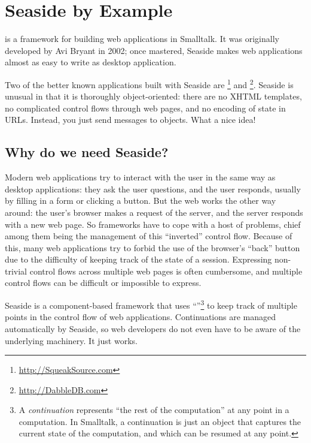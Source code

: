 \documentclass[a4paper,10pt,twoside]{book}
\begin{document}
	\sloppy
\fi
\chapter{Seaside by Example}
\label{cha:seaside}




 is a framework for building web applications in Smalltalk.  It was originally developed by Avi Bryant  in 2002; once mastered, Seaside makes web applications almost as easy to write as desktop application.

Two of the better known applications built with Seaside are \footnote{\url{http://SqueakSource.com}} and \footnote{\url{http://DabbleDB.com}}.
Seaside is unusual in that it is thoroughly object-oriented: there are no XHTML templates, no complicated control flows through web pages, and no encoding of state in URLs. Instead, you just send messages to objects.  What a nice idea!

\section{Why do we need Seaside?}

Modern web applications try to interact with the user in the same way as desktop applications: they ask the user questions, and the user responds, usually by filling in a form or clicking a button.
But the web works the other way around: the user's browser makes a request of the server, and the server responds with a new web page.
So  frameworks have to cope with a host of problems, chief among them being the management of this ``inverted'' control flow. 
Because of this, many web applications try to forbid the use of the browser's ``back'' button due to the difficulty of keeping track of the state of a session. 
Expressing non-trivial control flows across multiple web pages is often cumbersome, and multiple control flows can be difficult or impossible to express.

Seaside is a component-based framework that uses ``''\footnote{A \emph{continuation} represents ``the rest of the computation'' at any point in a computation. In Smalltalk, a continuation is just an object that captures the current state of the computation, and which can be resumed at any point.} to keep track of multiple points in the control flow of web applications. Continuations are managed automatically by Seaside, so web developers do not even have to be aware of the underlying machinery. It just works.
\end{document}
